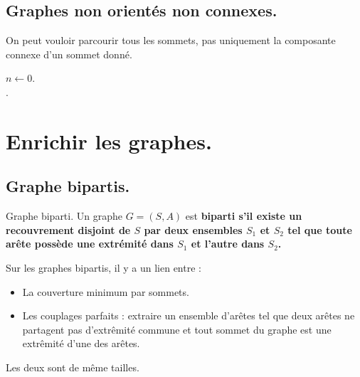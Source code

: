 \documentclass[french, 11pt]{article}
\begin{document}
\subsection{Graphes non orientés non connexes.}

\begin{defi}{}{}
    On peut vouloir parcourir tous les sommets, pas uniquement la composante connexe d'un sommet donné.\n
    \hspace*{0.28cm}\begin{algorithm}[H]
        \LinesNumbered
        \caption{Générique de parcours de graphe.}
        $n\gets0$.\\
        .
    \end{algorithm}
\end{defi}

\section{Enrichir les graphes.}

\subsection{Graphe bipartis.}

\begin{defi}{Graphe biparti.}{}
    Un graphe $G=(S,A)$ est \bf{biparti} s'il existe un recouvrement disjoint de $S$ par deux ensembles $S_1$ et $S_2$ tel que toute arête possède une extrémité dans $S_1$ et l'autre dans $S_2$.
\end{defi}

\begin{prop}{}{}
    Sur les graphes bipartis, il y a un lien entre :
    \begin{itemize}
        \item La couverture minimum par sommets.
        \item Les couplages parfaits : extraire un ensemble d'arêtes tel que deux arêtes ne partagent pas d'extrêmité commune et tout sommet du graphe est une extrêmité d'une des arêtes.
    \end{itemize}
    Les deux sont de même tailles.
\end{prop}
\end{document}
